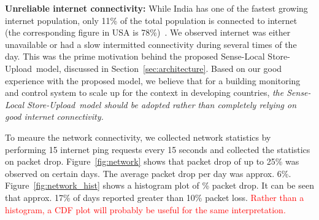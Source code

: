 \documentclass[10pt]{sensys-proc}
\newcommand{\redcolor}[1]{\textcolor{red}{#1}}
\newcommand{\figref}[1]{Figure~\ref{#1}}
\newcommand{\secref}[1]{Section~\ref{#1}}
\newcommand{\paradigms}{Sense-Local Store-Upload~}
\begin{document}
\noindent \textbf{Unreliable internet connectivity:} While India has one of the fastest growing internet population, only 11\% of the total population is connected to internet (the corresponding figure in USA is 78\%)~\cite{meyer}. %
We observed internet was either unavailable or had a slow intermitted connectivity during several times of the day. This was the prime motivation behind the proposed \paradigms model, discussed in \secref{sec:architecture}. Based on our good experience with the proposed model, we believe that for a building monitoring and control system to scale up for the context in developing countries, \emph{the \paradigms model should be adopted rather than completely relying on good internet connectivity.} %

\noindent To meaure the network connectivity, we collected network statistics by performing 15 internet ping requests every 15 seconds and collected the statistics on packet drop. \figref{fig:network} shows that packet drop of up to 25\% was observed on certain days. The average packet drop per day was approx. 6\%. \figref{fig:network_hist} shows a histogram plot of \% packet drop. It can be seen that approx. 17\% of days reported greater than 10\% packet loss. \redcolor{Rather than a histogram, a CDF plot will probably be useful for the same interpretation.}
\end{document}
